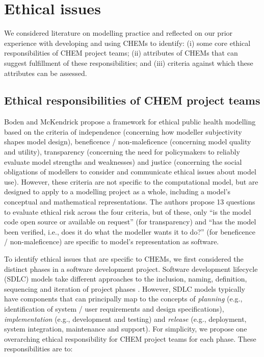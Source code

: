 \documentclass[sn-vancouver,Numbered,pdflatex]{sn-jnl}
\theoremstyle{remark}
\theoremstyle{definition}
\begin{document}
\hypertarget{ethical-issues}{%
\section{Ethical issues}\label{ethical-issues}}

We considered literature on modelling practice and reflected on our prior experience with developing and using CHEMs to identify: (i) some core ethical responsibilities of CHEM project teams; (ii) attributes of CHEMs that can suggest fulfillment of these responsibilities; and (iii) criteria against which these attributes can be assessed.

\hypertarget{ethical-responsibilities-of-chem-project-teams}{%
\subsection{Ethical responsibilities of CHEM project teams}\label{ethical-responsibilities-of-chem-project-teams}}

Boden and McKendrick \citep{10.3389/fpubh.2017.00068} propose a framework for ethical public health modelling based on the criteria of independence (concerning how modeller subjectivity shapes model design), beneficence / non-maleficence (concerning model quality and utility), transparency (concerning the need for policymakers to reliably evaluate model strengths and weaknesses) and justice (concerning the social obligations of modellers to consider and communicate ethical issues about model use). However, these criteria are not specific to the computational model, but are designed to apply to a modelling project as a whole, including a model's conceptual and mathematical representations. The authors propose 13 questions to evaluate ethical risk across the four criteria, but of these, only ``is the model code open source or available on request'' (for transparency) and ``has the model been verified, i.e., does it do what the modeller wants it to do?'' (for beneficence / non-maleficence) are specific to model's representation as software.

To identify ethical issues that are specific to CHEMs, we first considered the distinct phases in a software development project. Software development lifecycle (SDLC) models take different approaches to the inclusion, naming, definition, sequencing and iteration of project phases \citep{ruparelia2010software}. However, SDLC models typically have components that can principally map to the concepts of \emph{planning} (e.g., identification of system / user requirements and design specifications), \emph{implementation} (e.g., development and testing) and \emph{release} (e.g., deployment, system integration, maintenance and support). For simplicity, we propose one overarching ethical responsibility for CHEM project teams for each phase. These responsibilities are to:
\end{document}
